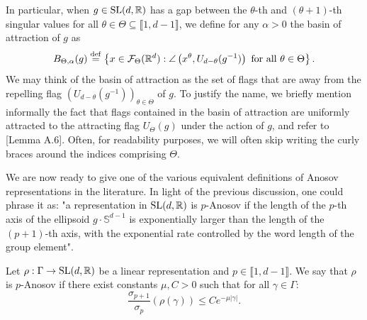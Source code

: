 \documentclass{report}
\begin{document}
In particular, when $g \in \operatorname{{\mathrm{SL}}}(d, \mathbb R)$ has a gap between the $\theta$-th and $(\theta+1)$-th singular values for all $\theta \in \Theta \subseteq \llbracket 1, d-1 \rrbracket$, we define for any $\alpha > 0$ the basin of attraction of $g$ as
\[
B_{\Theta, \alpha}(g) \overset{\mathrm{def}}{=} \left\{ x \in \mathcal F_{\Theta}(\mathbb R^d) : \angle \left(x^\theta, U_{d-\theta}(g^{-1})\right) \text{ for all } \theta \in \Theta \right\}.
\]
We may think of the basin of attraction as the set of flags that are away from the repelling flag $\left(U_{d-\theta}(g^{-1})\right)_{\theta \in \Theta}$ of $g$.
To justify the name, we briefly mention informally the fact that flags contained in the basin of attraction are uniformly attracted to the attracting flag $U_{\Theta}(g)$ under the action of $g$, and refer to \cite{bochi2019anosov}[Lemma A.6].
Often, for readability purposes, we will often skip writing the curly braces around the indices comprising $\Theta$.

We are now ready to give one of the various equivalent definitions of Anosov representations in the literature.
In light of the previous discussion, one could phrase it as: "a representation in $\operatorname{{\mathrm{SL}}}(d, \mathbb R)$ is $p$-Anosov if the length of the $p$-th axis of the ellipsoid $g \cdot \mathbb S^{d-1}$ is exponentially larger than the length of the $(p+1)$-th axis, with the exponential rate controlled by the word length of the group element". 
\begin{definition}\label{def:anosov}
    Let $\rho: \Gamma \to \operatorname{{\mathrm{SL}}}(d, \mathbb R)$ be a linear representation and $p \in \llbracket 1, d-1 \rrbracket$.
    We say that $\rho$ is $p$-Anosov if there exist constants $\mu, C>0$ such that for all $\gamma \in \Gamma$:
    \[
        \frac{\sigma_{p+1}}{\sigma_p}(\rho(\gamma)) \leq C e^{-\mu |\gamma|}.
    \]
\end{definition}
\end{document}
